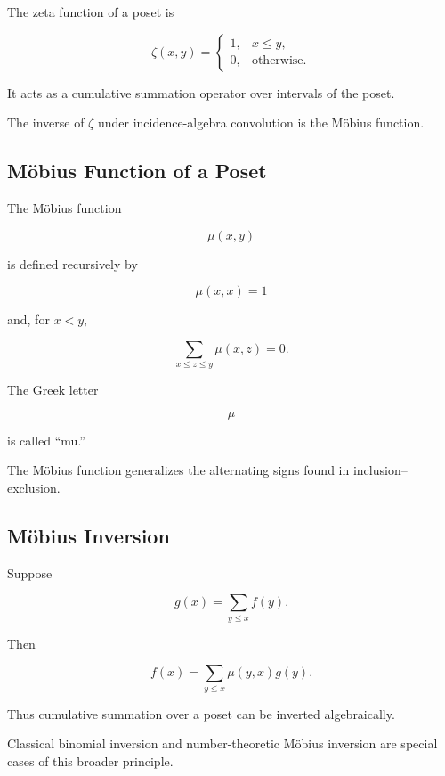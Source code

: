 The zeta function of a poset is

\[
\boxed{
\zeta(x,y)
=
\begin{cases}
1,&x\leq y,\\
0,&\text{otherwise}.
\end{cases}
}
\]

It acts as a cumulative summation operator over intervals of the poset.

The inverse of \(\zeta\) under incidence-algebra convolution is the
Möbius function.

\subsection{Möbius Function of a Poset}
\label{subsec:mobius-function-poset}

The Möbius function

\[
\mu(x,y)
\]

is defined recursively by

\[
\boxed{
\mu(x,x)=1
}
\]

and, for \(x<y\),

\[
\boxed{
\sum_{x\leq z\leq y}
\mu(x,z)=0.
}
\]

The Greek letter

\[
\mu
\]

is called ``mu.''

The Möbius function generalizes the alternating signs found in
inclusion--exclusion.

\subsection{Möbius Inversion}
\label{subsec:mobius-inversion-posets}

\begin{theorem}
Suppose

\[
g(x)
=
\sum_{y\leq x}f(y).
\]

Then

\[
\boxed{
f(x)
=
\sum_{y\leq x}
\mu(y,x)g(y).
}
\]
\end{theorem}

Thus cumulative summation over a poset can be inverted algebraically.

Classical binomial inversion and number-theoretic Möbius inversion are
special cases of this broader principle.

